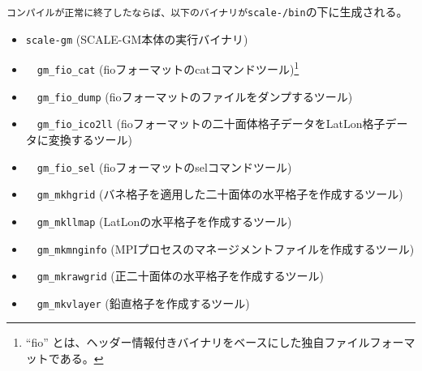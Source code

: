 \verb|コンパイルが正常に終了したならば、以下のバイナリが|\texttt{scale-{\version}/bin}の下に生成される。
 \begin{itemize}
   \item \verb|scale-gm| (SCALE-GM本体の実行バイナリ)
   \item　\verb|gm_fio_cat| (fioフォーマットのcatコマンドツール)\footnote{``fio'' とは、ヘッダー情報付きバイナリをベースにした独自ファイルフォーマットである。}
   \item　\verb|gm_fio_dump| (fioフォーマットのファイルをダンプするツール)
   \item　\verb|gm_fio_ico2ll| (fioフォーマットの二十面体格子データをLatLon格子データに変換するツール)
   \item　\verb|gm_fio_sel| (fioフォーマットのselコマンドツール)
   \item　\verb|gm_mkhgrid| (バネ格子を適用した二十面体の水平格子を作成するツール)
   \item　\verb|gm_mkllmap| (LatLonの水平格子を作成するツール)
   \item　\verb|gm_mkmnginfo| (MPIプロセスのマネージメントファイルを作成するツール)
   \item　\verb|gm_mkrawgrid| (正二十面体の水平格子を作成するツール)
   \item　\verb|gm_mkvlayer| (鉛直格子を作成するツール)
 \end{itemize}


